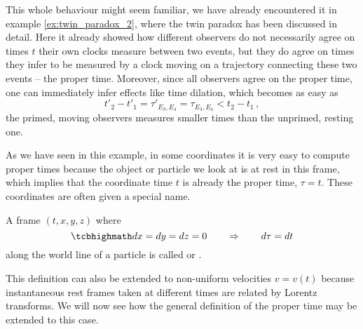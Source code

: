 \begin{ex}
	
	This whole behaviour might seem familiar, we have already encountered it in example \ref{ex:twin_paradox_2}, where the twin paradox has been discussed in detail. Here it already showed how different observers do not necessarily agree on times $t$ their own clocks measure between two events, but they do agree on times they infer to be measured by a clock moving on a trajectory connecting these two events -- the proper time. Moreover, since all observers agree on the proper time, one can immediately infer effects like time dilation, which becomes as easy as
	\begin{equation*}
		t'_2 - t'_1 = \tau'_{E_3, E_4} = \tau_{E_3, E_4} < t_2 - t_1 \, ,
	\end{equation*}
	the primed, moving observers measures smaller times than the unprimed, resting one.
\end{ex}

As we have seen in this example, in some coordinates it is very easy to compute proper times because the object or particle we look at is at rest in this frame, which implies that the coordinate time $t$ is already the proper time, $\tau = t$. These coordinates are often given a special name.
\begin{defi}
	A frame $(t, x, y, z)$ where
	\begin{equation}
		\eqbox{
		dx = dy = dz = 0
		\qquad \Rightarrow \qquad d\tau = dt
		}
	\end{equation}
	along the world line of a particle is called  or .
\end{defi}
This definition can also be extended to non-uniform velocities $v = v(t)$ because instantaneous rest frames taken at different times are related by Lorentz transforms. We will now see how the general definition of the proper time may be extended to this case.



